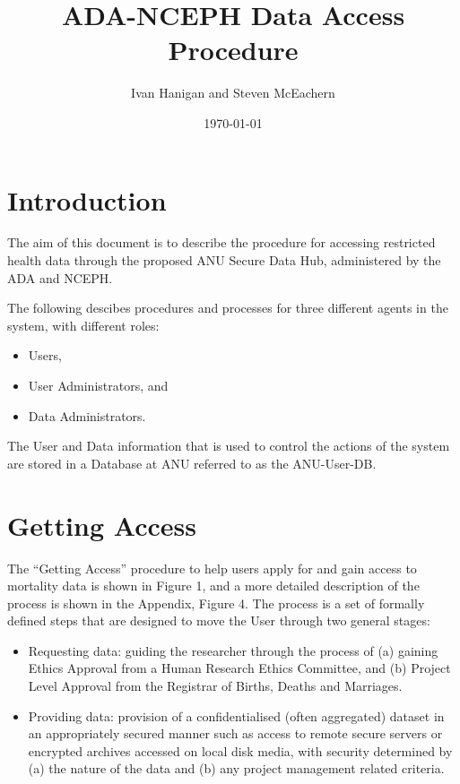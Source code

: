 \documentclass[a4paper]{article}
\title{ADA-NCEPH Data Access Procedure}
\author{Ivan Hanigan and Steven McEachern}
\date{\today}
\begin{document}
\maketitle

\tableofcontents

\section{Introduction}
\label{sec-1}

The aim of this document is to describe the procedure for accessing restricted health data through the proposed ANU Secure Data Hub, administered by the ADA and NCEPH.

The following descibes procedures and processes for three different agents in the system, with different roles:
\begin{itemize}
\item Users,
\item User Administrators, and
\item Data Administrators.
\end{itemize}

The User and Data information that is used to control the actions of the system are stored in a Database at ANU referred to as the ANU-User-DB.
\newpage
\section{Getting Access}
\label{sec-2}

The ``Getting Access'' procedure to help users apply for and gain access to mortality data is shown in Figure 1, and a more detailed description of the process is shown in the Appendix, Figure 4. The process is a set of formally defined steps that are designed to move the User through two general stages:
\begin{itemize}
\item Requesting data: guiding the researcher through the process of (a) gaining Ethics Approval from a Human Research Ethics Committee, and (b) Project Level Approval from the Registrar of Births, Deaths and Marriages.
\item Providing data: provision of a confidentialised (often aggregated) dataset in an appropriately secured manner such as access to remote secure servers or encrypted archives accessed on local disk media, with security determined by (a) the nature of the data and (b) any project management related criteria.
\end{itemize}
\end{document}
